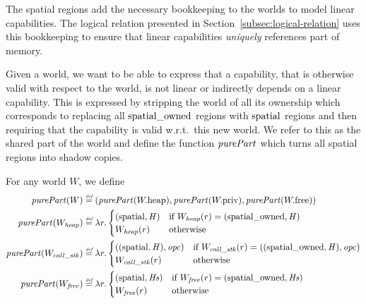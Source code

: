 \begin{jversion}
The spatial regions add the necessary bookkeeping to the worlds to model linear capabilities.
The logical relation presented in Section~\ref{subsec:logical-relation} uses this bookkeeping to ensure that linear capabilities \emph{uniquely} references part of memory.

Given a world, we want to be able to express that a capability, that is otherwise valid with respect to the world, is not linear or indirectly depends on a linear capability.
This is expressed by stripping the world of all its ownership which corresponds to replacing all $\mathrm{spatial\_owned}$ regions with $\mathrm{spatial}$ regions and then requiring that the capability is valid w.r.t.\ this new world.
We refer to this as the shared part of the world and define the function $\purePart{}$ which turns all spatial regions into shadow copies.
\begin{definition}
  \label{def:purePart}
  For any world $W$, we define
  \begin{align*}
    \purePart{W} &\defeq (\purePart{\pwheap},\purePart{\pwpriv},\purePart{\pwfree})\\
    \purePart{W_\var{heap}} &\defeq \lambda r\ldotp
                       \begin{cases}
                         (\spatial,\var{H}) & \text{if } W_\var{heap}(r) = (\spatialo,\var{H})\\
                         W_{\var{heap}}(r) & \text{otherwise}
                       \end{cases}\\
    \purePart{W_\var{call\_stk}} &\defeq \lambda r\ldotp
                       \begin{cases}
                         ((\spatial,\var{H}),\opc) & \text{if } W_\var{call\_stk}(r) = ((\spatialo,\var{H}),\opc)\\
                         W_\var{call\_stk}(r) & \text{otherwise}
                       \end{cases}\\
    \purePart{W_\var{free}} &\defeq \lambda r\ldotp
                       \begin{cases}
                         (\spatial,\var{Hs}) & \text{if } W_{\var{free}}(r) = (\spatialo,\var{Hs})\\
                         W_{\var{free}}(r) & \text{otherwise}
                       \end{cases}
  \end{align*}
\end{definition}

\end{jversion}
